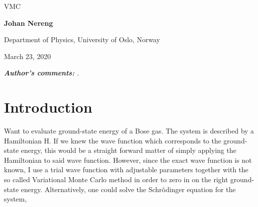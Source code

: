 \documentclass[%
oneside,                 %
final,                   %
10pt]{article}
\begin{document}

\newcommand{\exercisesection}[1]{\subsection*{#1}}






\thispagestyle{empty}

\begin{center}
{\LARGE\bf
\begin{spacing}{1.25}
VMC%
\end{spacing}
}
\end{center}


\begin{center}
{\bf Johan Nereng}
\end{center}

    \begin{center}
\centerline{{\small Department of Physics, University of Oslo, Norway}}
\end{center}
    

\begin{center}
March 23, 2020
\end{center}

\vspace{3cm}
\vspace{3cm}
\begin{abstract}


\end{abstract}


\newpage


\textit{\textbf{Author's comments:} .}
\newpage

\section{Introduction}
Want to evaluate ground-state energy of a Bose gas. The system is described by a Hamiltonian H. If we knew the wave function which corresponds to the ground-state energy, this would be a straight forward matter of simply applying the Hamiltonian to said wave function. However, since the exact wave function is not known, I use a trial wave function with adjustable parameters together with the so called Variational Monte Carlo method in order to zero in on the right ground-state energy. Alternatively, one could solve the Schrõdinger equation for the system, 
\end{document}
